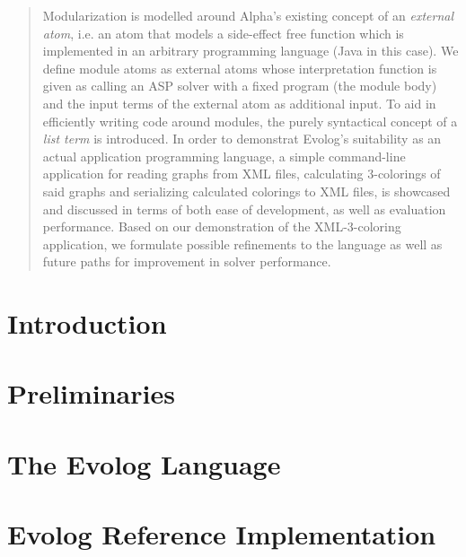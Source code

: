 \documentclass[draft,final]{vutinfth} %
\theoremstyle{definition}
\begin{document}
\begin{abstract}
Modularization is modelled around Alpha's existing concept of an \emph{external atom}, i.e. an atom that models a side-effect free function which is implemented in an arbitrary programming language (Java in this case). We define module atoms as external atoms whose interpretation function is given as calling an ASP solver with a fixed program (the module body) and the input terms of the external atom as additional input. To aid in efficiently writing code around modules, the purely syntactical concept of a \emph{list term} is introduced.
In order to demonstrat Evolog's suitability as an actual application programming language, a simple command-line application for reading graphs from XML files, calculating 3-colorings of said graphs and serializing calculated colorings to XML files, is showcased and discussed in terms of both ease of development, as well as evaluation performance. Based on our demonstration of the XML-3-coloring application, we formulate possible refinements to the language as well as future paths for improvement in solver performance.
\end{abstract}


\tableofcontents %

\mainmatter

\chapter{Introduction}

\chapter{Preliminaries}


\chapter{The Evolog Language}
\label{chap:language}


\chapter{Evolog Reference Implementation}
\label{chap:implementation}

\end{document}
